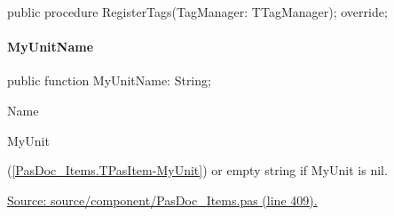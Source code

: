 \documentclass{report}
\newif\ifpdf
\begin{document}
\label{PasDoc_Items.TPasItem-RegisterTags}
\begin{list}{}{
\setlength{\itemindent}{0cm}
\setlength{\listparindent}{0cm}
\setlength{\leftmargin}{\evensidemargin}
\addtolength{\leftmargin}{\tmplength}
\settowidth{\labelsep}{X}
\addtolength{\leftmargin}{\labelsep}
\setlength{\labelwidth}{\tmplength}
}
\item[\textbf{Declaration}\hfill]
\ifpdf
\begin{flushleft}
\fi
\begin{ttfamily}
public procedure RegisterTags(TagManager: TTagManager); override;\end{ttfamily}

\ifpdf
\end{flushleft}
\fi

\end{list}
\paragraph*{MyUnitName}\hspace*{\fill}

\label{PasDoc_Items.TPasItem-MyUnitName}
\begin{list}{}{
\setlength{\itemindent}{0cm}
\setlength{\listparindent}{0cm}
\setlength{\leftmargin}{\evensidemargin}
\addtolength{\leftmargin}{\tmplength}
\settowidth{\labelsep}{X}
\addtolength{\leftmargin}{\labelsep}
\setlength{\labelwidth}{\tmplength}
}
\item[\textbf{Declaration}\hfill]
\ifpdf
\begin{flushleft}
\fi
\begin{ttfamily}
public function MyUnitName: String;\end{ttfamily}

\ifpdf
\end{flushleft}
\fi

\par
\item[\textbf{Description}]
Name \begin{ttfamily}MyUnit\end{ttfamily}(\ref{PasDoc_Items.TPasItem-MyUnit}) or empty string if MyUnit is nil.\par
\href{https://github.com/pasdoc/pasdoc/blob/master/source/component/PasDoc_Items.pas#L409}{Source: source/component/PasDoc{\_}Items.pas (line 409).}

\end{list}
\end{document}
